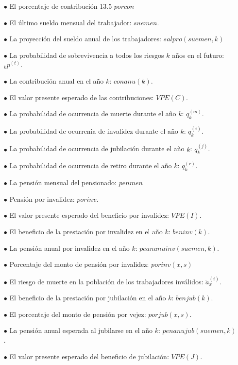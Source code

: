 \documentclass[12pt,letterpaper,titlepage]{article}
\begin{document}
\begin{itemize}
	\item [$\bullet$] El porcentaje de contribución 13.5 $porcon$
	\item [$\bullet$] El último sueldo mensual del trabajador: $suemen$.
	\item [$\bullet$] La proyección del sueldo anual de los trabajadores: $salpro(suemen, k)$
	\item [$\bullet$] La probabilidad de sobrevivencia a todos los riesgos $k$ años en el futuro: $_{k}p^{(t)}$.
	\item [$\bullet$] La contribución anual en el año $k$: $conanu(k)$.
	\item [$\bullet$] El valor presente esperado de las contribuciones: $VPE(C)$.
	\item [$\bullet$] La probabilidad de ocurrencia de muerte durante el año $k$: $q_{k}^{(m)}$.
	\item [$\bullet$] La probabilidad de ocurrenia de invalidez durante el año $k$: $q_{k}^{(i)}$.
	\item [$\bullet$] La probabilidad de ocurrencia de jubilación durante el año $k$: $q_{k}^{(j)}$.
	\item [$\bullet$] La probabilidad de ocurrencia de retiro durante el año $k$: $q_{k}^{(r)}$.
	\item [$\bullet$] La pensión mensual del pensionado: $penmen$
	\item [$\bullet$] Pensión por invalidez: $porinv$.
	\item [$\bullet$] El valor presente esperado del beneficio por invalidez: $VPE(I)$.
	\item [$\bullet$] El beneficio de la prestación por invalidez en el año $k$: $beninv(k)$.
	\item [$\bullet$] La pensión anual por invalidez en el año $k$: $peananuinv(suemen, k)$.
	\item [$\bullet$] Porcentaje del monto de pensión por invalidez: $porinv(x,s)$
	\item [$\bullet$] El riesgo de muerte en la población de los trabajadores inválidos: $\ddot{a}^{(i)}_{x}$.
	\item [$\bullet$] El beneficio de la prestación por jubilación en el año $k$: $benjub(k)$.
	\item [$\bullet$] El porcentaje del monto de pensión por vejez: $porjub(x,s)$.
	\item [$\bullet$] La pensión anual esperada al jubilarse en el año $k$: $penanujub(suemen,k)$.
	\item [$\bullet$] El valor presente esperado del beneficio de jubilación: $VPE(J)$.

\end{itemize}
\end{document}
